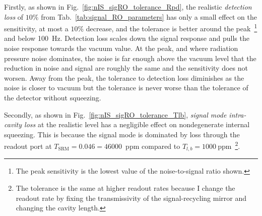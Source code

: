 Firstly, as shown in Fig.~\ref{fig:nIS_sigRO_tolerance_Rpd}, the realistic \emph{detection loss} of $10\%$ from Tab.~\ref{tab:signal_RO_parameters} has only a small effect on the sensitivity, at most a $10\%$ decrease, and the tolerance is better around the peak~\footnote{The peak sensitivity is the lowest value of the noise-to-signal ratio shown.} and below 100~Hz.
Detection loss scales down the signal response and pulls the noise response towards the vacuum value. At the peak, and where radiation pressure noise dominates, the noise is far enough above the vacuum level that the reduction in noise and signal are roughly the same and the sensitivity does not worsen. Away from the peak, the tolerance to detection loss diminishes as the noise is closer to vacuum but the tolerance is never worse than the tolerance of the detector without squeezing. %

Secondly, as shown in Fig.~\ref{fig:nIS_sigRO_tolerance_Tlb}, \emph{signal mode intra-cavity loss} at the realistic level has a negligible effect on nondegenerate internal squeezing. This is because the signal mode is dominated by loss through the readout port at $T_\text{SRM}=0.046=46000$~ppm compared to $T_{l,b}=1000~\text{ppm}$~\footnote{The tolerance is the same at higher readout rates because I change the readout rate by fixing the transmissivity of the signal-recycling mirror and changing the cavity length.}. %

